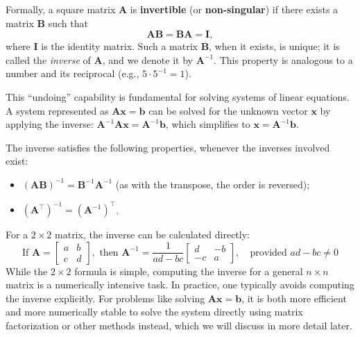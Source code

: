 Formally, a square matrix $ \mathbf{A} $ is \textbf{invertible} (or \textbf{non-singular}) if there exists a matrix $ \mathbf{B} $ such that
\begin{equation*}
    \mathbf{A}\mathbf{B} = \mathbf{B}\mathbf{A} = \mathbf{I},
\end{equation*}
where $ \mathbf{I} $ is the identity matrix. Such a matrix $ \mathbf{B} $, when it exists, is unique; it is called the \emph{inverse} of $ \mathbf{A} $, and we denote it by $ \mathbf{A}^{-1} $. This property is analogous to a number and its reciprocal (e.g., $ 5 \cdot 5^{-1} = 1 $).


This ``undoing'' capability is fundamental for solving systems of linear equations. A system represented as $ \mathbf{A}\mathbf{x} = \mathbf{b} $ can be solved for the unknown vector $ \mathbf{x} $ by applying the inverse: $ \mathbf{A}^{-1}\mathbf{A}\mathbf{x} = \mathbf{A}^{-1}\mathbf{b} $, which simplifies to $ \mathbf{x} = \mathbf{A}^{-1}\mathbf{b} $.

The inverse satisfies the following properties, whenever the inverses involved exist:
\begin{itemize}
    \item $(\mathbf{A}\mathbf{B})^{-1} = \mathbf{B}^{-1}\mathbf{A}^{-1}$ (as with the transpose, the order is reversed);
    \item $(\mathbf{A}^\top)^{-1} = (\mathbf{A}^{-1})^\top$.
\end{itemize}
For a $2\times 2$ matrix, the inverse can be calculated directly:
\begin{equation*}
    \text{If } \mathbf{A} = \begin{bmatrix} a & b \\ c & d \end{bmatrix}, \text{ then } \mathbf{A}^{-1} = \frac{1}{ad-bc} \begin{bmatrix} d & -b \\ -c & a \end{bmatrix}, \quad \text{provided } ad-bc \neq 0
\end{equation*}
While the $2 \times 2$ formula is simple, computing the inverse for a general $n \times n$ matrix is a numerically intensive task. In practice, one typically avoids computing the inverse explicitly. For problems like solving $\mathbf{A}\mathbf{x} = \mathbf{b}$, it is both more efficient and more numerically stable to solve the system directly using matrix factorization or other methods instead, which we will discuss in more detail later.


